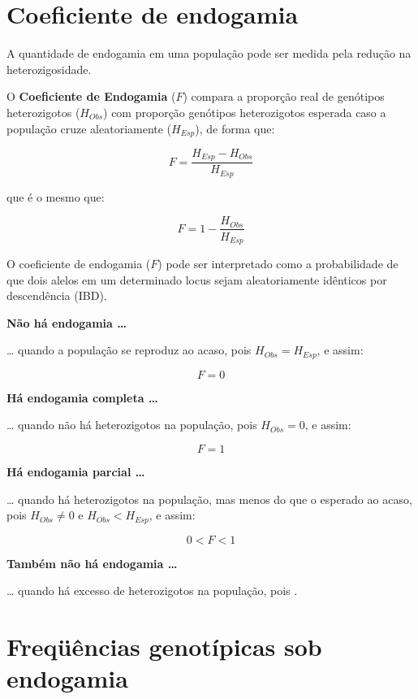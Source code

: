 \documentclass[
]{book}
\begin{document}
\hypertarget{coeficiente-de-endogamia}{%
\section{Coeficiente de endogamia}\label{coeficiente-de-endogamia}}

A quantidade de endogamia em uma população pode ser medida pela redução na heterozigosidade.

O \textbf{Coeficiente de Endogamia} (\(F\)) compara a proporção real de genótipos heterozigotos (\(H_{Obs}\)) com proporção genótipos heterozigotos esperada caso a população cruze aleatoriamente (\(H_{Esp}\)), de forma que:

\begin{equation} 
  F=\frac{H_{Esp} - H_{Obs}}{H_{Esp}}
  \label{eq:endogamia}
\end{equation}

que é o mesmo que:

\[F=1 -  \frac{H_{Obs}}{H_{Esp}}\]

O coeficiente de endogamia (\(F\)) pode ser interpretado como a probabilidade de que dois alelos em um determinado locus sejam aleatoriamente idênticos por descendência (IBD).

\textbf{Não há endogamia \ldots{}}

\ldots{} quando a população se reproduz ao acaso, pois \(H_{Obs}=H_{Esp}\), e assim:

\[F=0\]

\textbf{Há endogamia completa \ldots{}}

\ldots{} quando não há heterozigotos na população, pois \(H_{Obs}=0\), e assim:

\[F=1\]

\textbf{Há endogamia parcial \ldots{}}

\ldots{} quando há heterozigotos na população, mas menos do que o esperado ao acaso, pois \(H_{Obs}\ne0\) e \(H_{Obs}<H_{Esp}\), e assim:

\[0<F<1\]

\textbf{Também não há endogamia \ldots{}}

\ldots{} quando há excesso de heterozigotos na população, pois .

\hypertarget{frequxfcuxeancias-genotuxedpicas-sob-endogamia-1}{%
\section{Freqüências genotípicas sob endogamia}\label{frequxfcuxeancias-genotuxedpicas-sob-endogamia-1}}
\end{document}
